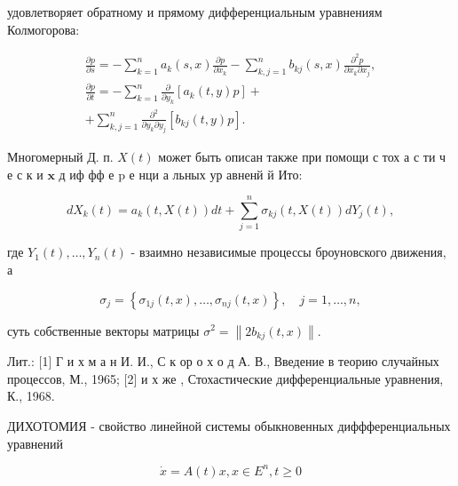 \documentclass[10pt]{article}
\begin{document}
удовлетворяет обратному и прямому дифференциальным уравнениям Колмогорова:



\[

\begin{gathered}

\frac{\partial p}{\partial s}=-\sum_{k=1}^{n} a_{k}(s, x) \frac{\partial p}{\partial x_{k}}-\sum_{k, j=1}^{n} b_{k j}(s, x) \frac{\partial^{2} p}{\partial x_{k} \partial x_{j}}, \\

\frac{\partial p}{\partial t}=-\sum_{k=1}^{n} \frac{\partial}{\partial y_{k}}\left[a_{k}(t, y) p\right]+ \\

+\sum_{k, j=1}^{n} \frac{\partial^{2}}{\partial y_{k} \partial y_{j}}\left[b_{k j}(t, y) p\right] .

\end{gathered}

\]



Многомерный Д. п. $X(t)$ может быть описан также при помощи с тох а с ти ч е с к и $\mathbf{x}$ д иф фф е $\mathrm{p}$ е нци а льных ур авненй й Ито:



\[

d X_{k}(t)=a_{k}(t, X(t)) d t+\sum_{j=1}^{n} \sigma_{k j}(t, X(t)) d Y_{j}(t),

\]



где $Y_{1}(t), \ldots, Y_{n}(t)$ - взаимно независимые процессы броуновского движения, а



\[

\sigma_{j}=\left\{\sigma_{1 j}(t, x), \ldots, \sigma_{n j}(t, x)\right\}, \quad j=1, \ldots, n,

\]



суть собственные векторы матрицы $\sigma^{2}=\left\|2 b_{k j}(t, x)\right\|$.



Лит.: [1] Г и х м а н И. И., С к ор о х о д А. В., Введение в теорию случайных процессов, М., 1965; [2] и х же , Стохастические дифференциальные уравнения, К., 1968.



ДИХОТОМИЯ - свойство линейной системы обыкновенных диффференциальных уравнений



\[

\dot{x}=A(t) x, x \in E^{n}, t \geqslant 0

\]
\end{document}
